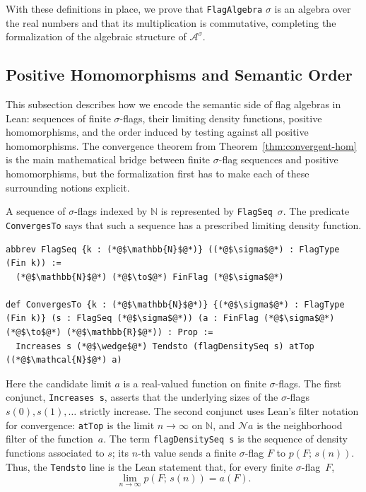 \documentclass{article}
\newcommand{\den}[2]{p(#1;\,#2)}
\newcommand{\lean}[1]{\texttt{#1}}
\begin{document}
With these definitions in place, we prove that \lean{FlagAlgebra} $\sigma$ is
an algebra over the real numbers and that its multiplication is commutative,
completing the formalization of the algebraic structure of
$\mathcal{A}^\sigma$.

\subsection{Positive Homomorphisms and Semantic Order}

This subsection describes how we encode the semantic side of flag algebras in
Lean: sequences of finite $\sigma$-flags, their limiting density functions, positive
homomorphisms, and the order induced by testing against all positive
homomorphisms.  The convergence theorem from
Theorem~\ref{thm:convergent-hom} is the main mathematical bridge between finite
$\sigma$-flag sequences and positive homomorphisms, but the formalization first has to
make each of these surrounding notions explicit.

A sequence of $\sigma$-flags indexed by $\mathbb{N}$ is represented by
\lean{FlagSeq}~$\sigma$.  The predicate \lean{ConvergesTo} says that such a
sequence has a prescribed limiting density function.
\begin{lstlisting}
abbrev FlagSeq {k : (*@$\mathbb{N}$@*)} ((*@$\sigma$@*) : FlagType (Fin k)) :=
  (*@$\mathbb{N}$@*) (*@$\to$@*) FinFlag (*@$\sigma$@*)

def ConvergesTo {k : (*@$\mathbb{N}$@*)} {(*@$\sigma$@*) : FlagType (Fin k)} (s : FlagSeq (*@$\sigma$@*)) (a : FinFlag (*@$\sigma$@*) (*@$\to$@*) (*@$\mathbb{R}$@*)) : Prop :=
  Increases s (*@$\wedge$@*) Tendsto (flagDensitySeq s) atTop ((*@$\mathcal{N}$@*) a)
\end{lstlisting}
Here the candidate limit \(a\) is a real-valued function on finite
\(\sigma\)-flags.  The first conjunct, \lean{Increases s}, asserts that the
underlying sizes of the \(\sigma\)-flags \(s(0),s(1),\ldots\) strictly increase.  The
second conjunct uses Lean's filter notation for convergence:
\lean{atTop} is the limit \(n\to\infty\) on \(\mathbb{N}\), and
\(\mathcal{N} a\) is the neighborhood filter of the function~\(a\).  The term
\lean{flagDensitySeq s} is the sequence of density functions associated to
\(s\); its \(n\)-th value sends a finite \(\sigma\)-flag \(F\) to
\(\den{F}{s(n)}\).  Thus, the \lean{Tendsto} line is the Lean statement that,
for every finite \(\sigma\)-flag~\(F\),
\[
  \lim_{n\to\infty}\den{F}{s(n)}=a(F).
\]
\end{document}
